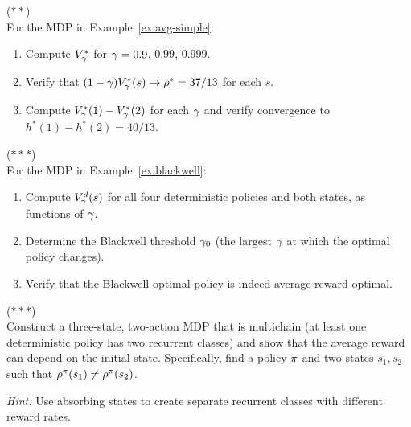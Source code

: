 \documentclass[11pt,a4paper]{article}
\begin{document}
\begin{exercise}
\textnormal{(\(**\))} \\
For the MDP in Example~\ref{ex:avg-simple}:
\begin{enumerate}[label=(\alph*)]
    \item Compute $V^*_\gamma$ for $\gamma = 0.9$, $0.99$,
    $0.999$.
    \item Verify that $(1-\gamma)V^*_\gamma(s) \to
    \rho^* = 37/13$ for each $s$.
    \item Compute $V^*_\gamma(1) - V^*_\gamma(2)$ for
    each $\gamma$ and verify convergence to
    $h^*(1) - h^*(2) = 40/13$.
\end{enumerate}
\end{exercise}

\begin{exercise}
\textnormal{(\(***\))} \\
For the MDP in Example~\ref{ex:blackwell}:
\begin{enumerate}[label=(\alph*)]
    \item Compute $V^d_\gamma(s)$ for all four deterministic
    policies and both states, as functions of $\gamma$.
    \item Determine the Blackwell threshold $\gamma_0$ (the
    largest $\gamma$ at which the optimal policy changes).
    \item Verify that the Blackwell optimal policy is indeed
    average-reward optimal.
\end{enumerate}
\end{exercise}

\begin{exercise}
\textnormal{(\(***\))} \\
Construct a three-state, two-action MDP that is multichain (at least
one deterministic policy has two recurrent classes) and show that the
average reward can depend on the initial state. Specifically, find
a policy $\pi$ and two states $s_1, s_2$ such that
$\rho^\pi(s_1) \neq \rho^\pi(s_2)$.

\textit{Hint:} Use absorbing states to create separate recurrent
classes with different reward rates.
\end{exercise}

\end{document}

